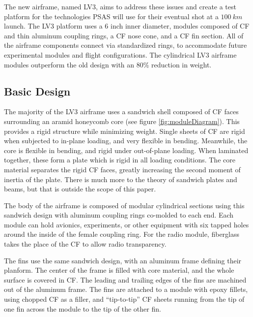 \documentclass{aiaa-tc}%
\newcommand{\weightReduction}{80\%}
\begin{document}
The new airframe, named LV3, aims to address these issues and create a test platform for the technologies PSAS will use for their eventual shot at a $\SI{100}{km}$ launch. The LV3 platform uses a 6 inch inner diameter, modules composed of CF and thin aluminum coupling rings, a CF nose cone, and a CF fin section. All of the airframe components connect via standardized rings, to accommodate future experimental modules and flight configurations.
The cylindrical LV3 airframe modules outperform the old design with an \weightReduction{} reduction in weight.

\pagebreak

\subsection{Basic Design}

The majority of the LV3 airframe uses a sandwich shell composed of CF faces surrounding an aramid honeycomb core (see figure \ref{fig:moduleDiagram}). This provides a rigid structure while minimizing weight. 
Single sheets of CF are rigid when subjected to in-plane loading, and very flexible in bending. Meanwhile, the core is flexible in bending, and rigid under out-of-plane loading. 
When laminated together, these form a plate which is rigid in all loading conditions. The core material separates the rigid CF faces, greatly increasing the second moment of inertia of the plate. 
There is much more to the theory of sandwich plates and beams, but that is outside the scope of this paper. 

The body of the airframe is composed of modular cylindrical sections using this sandwich design with aluminum coupling rings co-molded to each end.
Each module can hold avionics, experiments, or other equipment with six tapped holes around the inside of the female coupling ring. 
For the radio module, fiberglass takes the place of the CF to allow radio transparency.

The fins use the same sandwich design, with an aluminum frame defining their planform. The center of the frame is filled with core material, and the whole surface is covered in CF. 
The leading and trailing edges of the fins are machined out of the aluminum frame. 
The fins are attached to a module with epoxy fillets, using chopped CF as a filler, and ``tip-to-tip'' CF sheets running from the tip of one fin across the module to the tip of the other fin.
\end{document}
